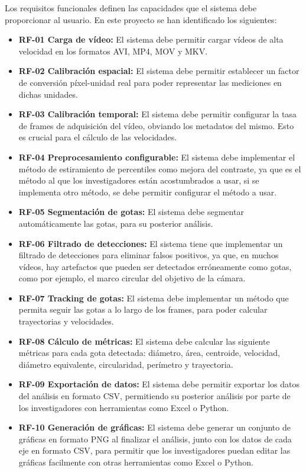 Los requisitos funcionales definen las capacidades que el sistema debe proporcionar al usuario. En este proyecto se han identificado los siguientes:

\begin{itemize}
    \item \textbf{RF-01 Carga de vídeo:} El sistema debe permitir cargar vídeos de alta velocidad en los formatos AVI, MP4, MOV y MKV.
    \item \textbf{RF-02 Calibración espacial:} El sistema debe permitir establecer un factor de conversión píxel-unidad real para poder representar las mediciones en dichas unidades.
    \item \textbf{RF-03 Calibración temporal:} El sistema debe permitir configurar la tasa de frames de adquisición del vídeo, obviando los metadatos del mismo. Esto es crucial para el cálculo de las velocidades.
    \item \textbf{RF-04 Preprocesamiento configurable:} El sistema debe implementar el método de estiramiento de percentiles como mejora del contraste, ya que es el método al que los investigadores están acostumbrados a usar, si se implementa otro método, se debe permitir configurar el método a usar.
    \item \textbf{RF-05 Segmentación de gotas:} El sistema debe segmentar automáticamente las gotas, para su posterior análisis.
    \item \textbf{RF-06 Filtrado de detecciones:} El sistema tiene que implementar un filtrado de detecciones para eliminar falsos positivos, ya que, en muchos vídeos, hay artefactos que pueden ser detectados erróneamente como gotas, como por ejemplo, el marco circular del objetivo de la cámara.
    \item \textbf{RF-07 Tracking de gotas:} El sistema debe implementar un método que permita seguir las gotas a lo largo de los frames, para poder calcular trayectorias y velocidades.
    \item \textbf{RF-08 Cálculo de métricas:} El sistema debe calcular las siguiente métricas para cada gota detectada: diámetro, área, centroide, velocidad, diámetro equivalente, circularidad, perímetro y trayectoria.
    \item \textbf{RF-09 Exportación de datos:} El sistema debe permitir exportar los datos del análisis en formato CSV, permitiendo su posterior análisis por parte de los investigadores con herramientas como Excel o Python.
    \item \textbf{RF-10 Generación de gráficas:} El sistema debe generar un conjunto de gráficas en formato PNG al finalizar el análisis, junto con los datos de cada eje en formato CSV, para permitir que los investigadores puedan editar las gráficas facilmente con otras herramientas como Excel o Python.

\end{itemize}
